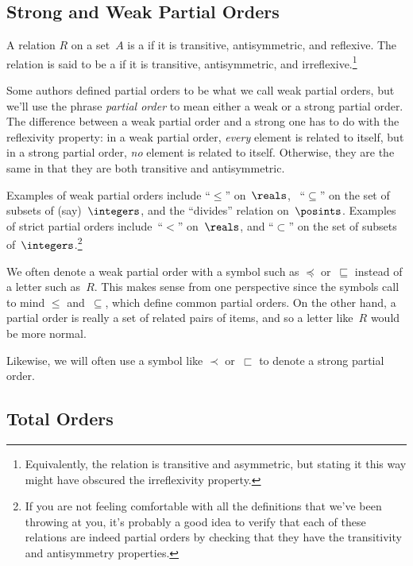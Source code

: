\subsection{Strong and Weak Partial Orders}

\begin{definition}\label{def:weak_po}

A relation $R$ on a set~$A$ is a  if it is
transitive, antisymmetric, and reflexive.  The relation is said to be
a  if it is transitive, antisymmetric, and
irreflexive.\footnote{Equivalently, the relation is transitive and
  asymmetric, but stating it this way might have obscured the
  irreflexivity property.}

\end{definition}

Some authors defined partial orders to be what we call weak partial
orders, but we'll use the phrase \emph{partial order} to mean either a
weak or a strong partial order.  The difference between a weak partial
order and a strong one has to do with the reflexivity property: in a
weak partial order, \emph{every} element is related to itself, but in
a strong partial order, \emph{no} element is related to itself.
Otherwise, they are the same in that they are both transitive and
antisymmetric.

Examples of weak partial orders include ``$\le$'' on~$\reals$,
\ ``$\subseteq$'' on the set of subsets of (say)~$\integers$, and the
``divides'' relation on~$\posints$.  Examples of strict partial
orders include~``$<$'' on~$\reals$, and ``$\subset$'' on the set of
subsets of~$\integers$.\footnote{If you are not feeling comfortable
  with all the definitions that we've been throwing at you, it's
  probably a good idea to verify that each of these relations are
  indeed partial orders by checking that they have the transitivity
  and antisymmetry properties.}

We often denote a weak partial order with a symbol such as $\preceq$
or~$\sqsubseteq$ instead of a letter such as~$R$.    This makes sense
from one perspective since the symbols call to mind $\le$
and~$\subseteq$, which define common partial orders.  On the other
hand, a partial order is really a set of related pairs of items, and
so a letter like~$R$ would be more normal.

Likewise, we will often use a symbol like $\prec$ or~$\sqsubset$ to
denote a strong partial order.

\subsection{Total Orders}

